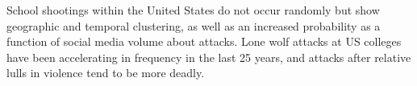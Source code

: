 School shootings within the United States do not
occur randomly but show geographic and temporal clustering,
as well as an increased probability 
as a function of social media volume
about attacks.
Lone wolf attacks at US colleges have been accelerating
in frequency in the last 25 years, and attacks
after relative lulls in violence tend to be more deadly.

